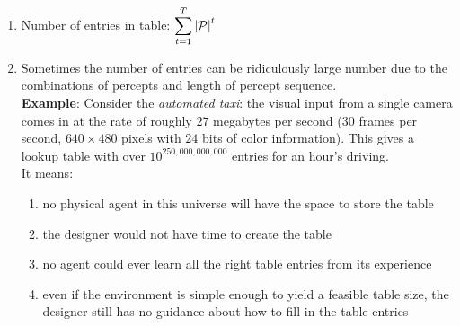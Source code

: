 \begin{enumerate}
    \item Number of entries in table: $
        \displaystyle\sum_{t=1}^T \left| \mathcal{P} \right|^t
    $
    \hfill \cite{ai/book/Artificial-Intelligence-A-Modern-Approach/Russell-Norvig}

    \item Sometimes the number of entries can be ridiculously large number due to the combinations of percepts and length of percept sequence.\\
    \textbf{Example}: Consider the \textit{automated taxi}: the visual input from a single camera comes in at the rate of roughly $27$ megabytes per second ($30$ frames per second, $640 \times 480$ pixels with $24$ bits of color information). This gives a lookup table with over $10^{250,000,000,000}$ entries for an hour’s driving.
    \hfill \cite{ai/book/Artificial-Intelligence-A-Modern-Approach/Russell-Norvig}
    \\
    It means:
    \begin{enumerate}
        \item no physical agent in this universe will have the space to store the table
        \hfill \cite{ai/book/Artificial-Intelligence-A-Modern-Approach/Russell-Norvig}

        \item the designer would not have time to create the table
        \hfill \cite{ai/book/Artificial-Intelligence-A-Modern-Approach/Russell-Norvig}

        \item no agent could ever learn all the right table entries from its experience
        \hfill \cite{ai/book/Artificial-Intelligence-A-Modern-Approach/Russell-Norvig}

        \item even if the environment is simple enough to yield a feasible table size, the designer still has no guidance about how to fill in the table entries
        \hfill \cite{ai/book/Artificial-Intelligence-A-Modern-Approach/Russell-Norvig}

    \end{enumerate}
\end{enumerate}

\vspace{0.5cm}

